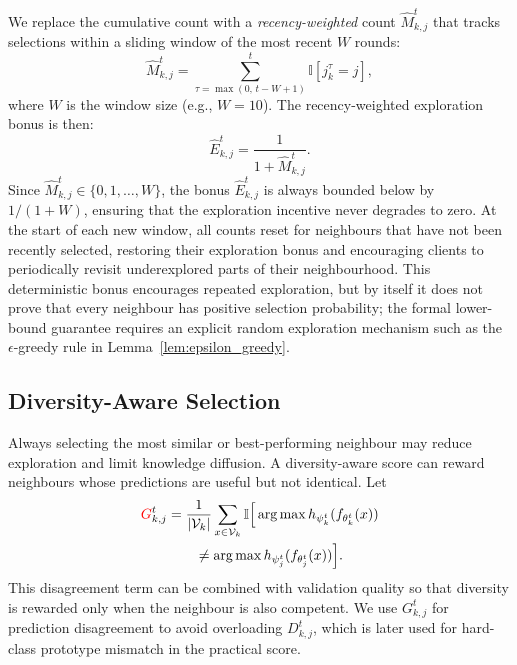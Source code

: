 \documentclass[conference]{IEEEtran}
\newcommand{\rev}[1]{{\color{red}#1}}
\begin{document}
We replace the cumulative count with a \emph{recency-weighted} count \(\hat{M}_{k,j}^t\) that tracks selections within a sliding window of the most recent \(W\) rounds:
\begin{equation}
    \hat{M}_{k,j}^t
    =
    \sum_{\tau = \max(0,\, t-W+1)}^{t}
    \mathbb{I}\left[j_k^\tau = j\right],
    \label{eq:recency_count}
\end{equation}
where \(W\) is the window size (e.g., \(W = 10\)). The recency-weighted exploration bonus is then:
\begin{equation}
    \hat{E}_{k,j}^t
    =
    \frac{1}{1 + \hat{M}_{k,j}^t}.
    \label{eq:recency_exploration}
\end{equation}
Since \(\hat{M}_{k,j}^t \in \{0, 1, \dots, W\}\), the bonus \(\hat{E}_{k,j}^t\) is always bounded below by \(1/(1+W)\), ensuring that the exploration incentive never degrades to zero. At the start of each new window, all counts reset for neighbours that have not been recently selected, restoring their exploration bonus and encouraging clients to periodically revisit underexplored parts of their neighbourhood. \rev{This deterministic bonus encourages repeated exploration, but by itself it does not prove that every neighbour has positive selection probability; the formal lower-bound guarantee requires an explicit random exploration mechanism such as the \(\epsilon\)-greedy rule in Lemma~\ref{lem:epsilon_greedy}.}

\subsection{Diversity-Aware Selection}
\label{subsec:diversity-aware-selection}
Always selecting the most similar or best-performing neighbour may reduce exploration and limit knowledge diffusion. A diversity-aware score can reward neighbours whose predictions are useful but not identical. Let
\begin{equation}
\begin{aligned}
\rev{G}_{k,j}^{t}
&=\frac{1}{|\mathcal{V}_k|}
\sum_{x\in\mathcal{V}_k}
\mathbb{I}\Big[
\arg\max h_{\psi_k^t}(f_{\theta_k^t}(x))\\
&\qquad\neq
\arg\max h_{\psi_j^t}(f_{\theta_j^t}(x))
\Big].
\end{aligned}
\label{eq:diversity_disagreement}
\end{equation}
This disagreement term can be combined with validation quality so that diversity is rewarded only when the neighbour is also competent. \rev{We use \(G_{k,j}^t\) for prediction disagreement to avoid overloading \(D_{k,j}^t\), which is later used for hard-class prototype mismatch in the practical score.}
\end{document}
